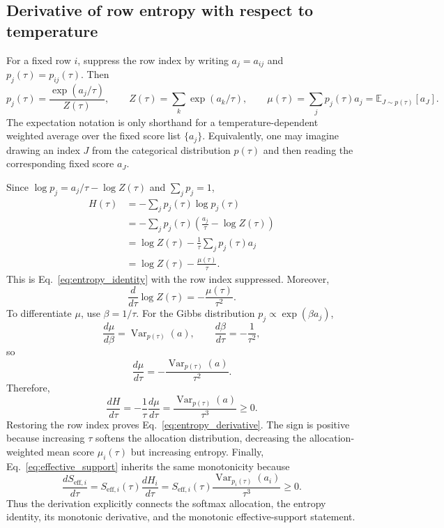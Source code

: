 \documentclass[11pt,a4paper]{article}
\begin{document}
\subsection{Derivative of row entropy with respect to temperature}

For a fixed row $i$, suppress the row index by writing $a_j=a_{ij}$ and $p_j(\tau)=p_{ij}(\tau)$. Then
\begin{equation}
  p_j(\tau)=\frac{\exp(a_j/\tau)}{Z(\tau)},
  \qquad
  Z(\tau)=\sum_k\exp(a_k/\tau),
  \qquad
  \mu(\tau)=\sum_j p_j(\tau)a_j=\mathbb E_{J\sim p(\tau)}[a_J].
\end{equation}
The expectation notation is only shorthand for a temperature-dependent weighted average over the fixed score list $\{a_j\}$. Equivalently, one may imagine drawing an index $J$ from the categorical distribution $p(\tau)$ and then reading the corresponding fixed score $a_J$.

Since $\log p_j=a_j/\tau-\log Z(\tau)$ and $\sum_jp_j=1$,
\begin{align}
  H(\tau)
  &=-\sum_j p_j(\tau)\log p_j(\tau) \\
  &=-\sum_jp_j(\tau)\left(\frac{a_j}{\tau}-\log Z(\tau)\right) \\
  &=\log Z(\tau)-\frac{1}{\tau}\sum_jp_j(\tau)a_j \\
  &=\log Z(\tau)-\frac{\mu(\tau)}{\tau}.
\end{align}
This is Eq.~\eqref{eq:entropy_identity} with the row index suppressed. Moreover,
\begin{equation}
  \frac{d}{d\tau}\log Z(\tau)
  =-\frac{\mu(\tau)}{\tau^2}.
\end{equation}
To differentiate $\mu$, use $\beta=1/\tau$. For the Gibbs distribution $p_j\propto\exp(\beta a_j)$,
\begin{equation}
  \frac{d\mu}{d\beta}=\operatorname{Var}_{p(\tau)}(a),
  \qquad
  \frac{d\beta}{d\tau}=-\frac{1}{\tau^2},
\end{equation}
so
\begin{equation}
  \frac{d\mu}{d\tau}=-\frac{\operatorname{Var}_{p(\tau)}(a)}{\tau^2}.
\end{equation}
Therefore,
\begin{equation}
  \frac{dH}{d\tau}
  =-\frac{1}{\tau}\frac{d\mu}{d\tau}
  =\frac{\operatorname{Var}_{p(\tau)}(a)}{\tau^3}\ge 0.
\end{equation}
Restoring the row index proves Eq.~\eqref{eq:entropy_derivative}. The sign is positive because increasing $\tau$ softens the allocation distribution, decreasing the allocation-weighted mean score $\mu_i(\tau)$ but increasing entropy. Finally, Eq.~\eqref{eq:effective_support} inherits the same monotonicity because
\[
  \frac{dS_{\mathrm{eff},i}}{d\tau}
  =S_{\mathrm{eff},i}(\tau)\frac{dH_i}{d\tau}
  =S_{\mathrm{eff},i}(\tau)
   \frac{\operatorname{Var}_{p_i(\tau)}(a_i)}{\tau^3}\ge 0.
\]
Thus the derivation explicitly connects the softmax allocation, the entropy identity, its monotonic derivative, and the monotonic effective-support statement.
\end{document}
